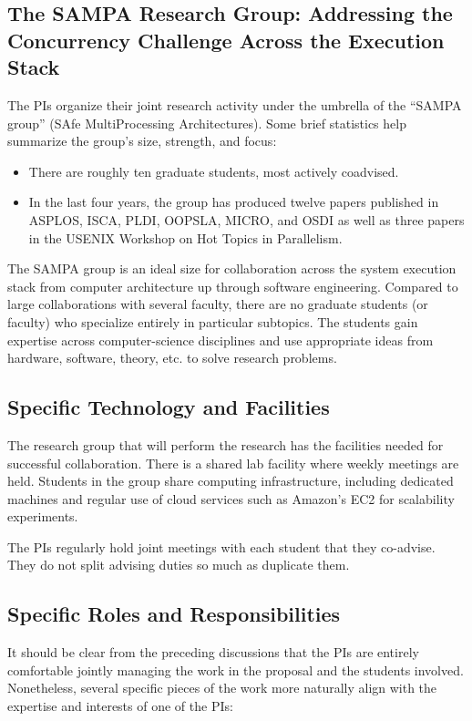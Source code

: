 \subsection*{The SAMPA Research Group: Addressing the Concurrency
  Challenge Across the Execution Stack}

The PIs organize their joint research activity under the umbrella of
the ``SAMPA group'' (SAfe MultiProcessing Architectures).  Some brief
statistics help summarize the group's size, strength, and focus:
\begin{itemize}
\item There are roughly ten graduate students, most actively
  coadvised.
\item In the last four years, the group has produced twelve papers
  published in ASPLOS, ISCA, PLDI, OOPSLA, MICRO, and OSDI as well as three
  papers in the USENIX Workshop on Hot Topics in Parallelism.
\end{itemize}
The SAMPA group is an ideal size for collaboration across the system
execution stack from computer architecture up through software
engineering.  Compared to large collaborations with several faculty,
there are no graduate students (or faculty) who specialize entirely in
particular subtopics.  The students gain expertise across
computer-science disciplines and use appropriate ideas from hardware,
software, theory, etc. to solve research problems.  

\subsection*{Specific Technology and Facilities}

The research group that will perform the research has the facilities
needed for successful collaboration.  There is a shared lab facility
where weekly meetings are held.  Students in the group share computing
infrastructure, including dedicated machines and regular use of cloud
services such as Amazon's EC2 for scalability experiments.

The PIs regularly hold joint meetings with each student that they
co-advise.  They do not split advising duties so much as duplicate
them.

\subsection*{Specific Roles and Responsibilities}

It should be clear from the preceding discussions that the PIs are
entirely comfortable jointly managing the work in the proposal and the
students involved.  Nonetheless, several specific pieces of the work
more naturally align with the expertise and interests of one of the
PIs:

